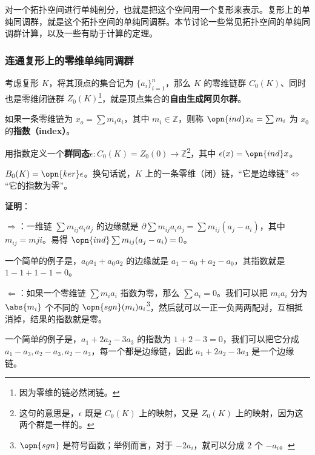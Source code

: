 



对一个拓扑空间进行单纯剖分，也就是把这个空间用一个复形来表示。复形上的单纯同调群，就是这个拓扑空间的单纯同调群。本节讨论一些常见拓扑空间的单纯同调群计算，以及一些有助于计算的定理。

\subsubsection{连通复形上的零维单纯同调群}

考虑复形 $K$，将其顶点的集合记为 $\{a_i\}_{i=1}^n$，那么 $K$ 的零维链群 $C_0(K)$、同时也是零维闭链群 $Z_0(K)$\footnote{因为零维的链必然闭链。}，就是顶点集合的\textbf{自由生成阿贝尔群}。

如果一条零维链为 $x_o=\sum m_ia_i$，其中 $m_i\in\mathbb{Z}$，则称 $\opn{ind} x_0=\sum m_i$ 为 $x_0$ 的\textbf{指数（index）}。

用指数定义一个\textbf{群同态}$\epsilon: C_0(K)=Z_0(0)\to\mathbb{Z}$\footnote{这句的意思是，$\epsilon$ 既是 $C_0(K)$ 上的映射，又是 $Z_0(K)$ 上的映射，因为这两个群是一样的。}，其中 $\epsilon(x)=\opn{ind} x$。

\begin{lemma}{}\label{lem_SHCal_1}
$B_0(K)=\opn{ker}\epsilon$。换句话说，$K$ 上的一条零维（闭）链，“它是边缘链”$\iff$“它的指数为零”。
\end{lemma}

\textbf{证明}：

$\Rightarrow$：一维链 $\sum m_{ij}a_ia_j$ 的边缘就是 $\partial\sum m_{ij}a_ia_j=\sum m_{ij}(a_j-a_i)$，其中 $m_{ij}=m{ji}$。易得 $\opn{ind}\sum m_{ij}(a_j-a_i)=0$。

一个简单的例子是，$a_0a_1+a_0a_2$ 的边缘就是 $a_1-a_0+a_2-a_0$，其指数就是 $1-1+1-1=0$。


$\Leftarrow$：如果一个零维链 $\sum m_ia_i$ 指数为零，那么 $\sum a_i=0$。我们可以把 $m_ia_i$ 分为 $\abs{m_i}$ 个不同的 $\opn{sgn}(m_i)a_i$\footnote{$\opn{sgn}$ 是符号函数；举例而言，对于 $-2a_i$，就可以分成 $2$ 个 $-a_i$。}，然后就可以一正一负两两配对，互相抵消掉，结果的指数就是零。

一个简单的例子是，$a_1+2a_2-3a_3$ 的指数为 $1+2-3=0$，我们可以把它分成 $a_1-a_3, a_2-a_3, a_2-a_3$，每一个都是边缘链，因此 $a_1+2a_2-3a_3$ 是一个边缘链。


